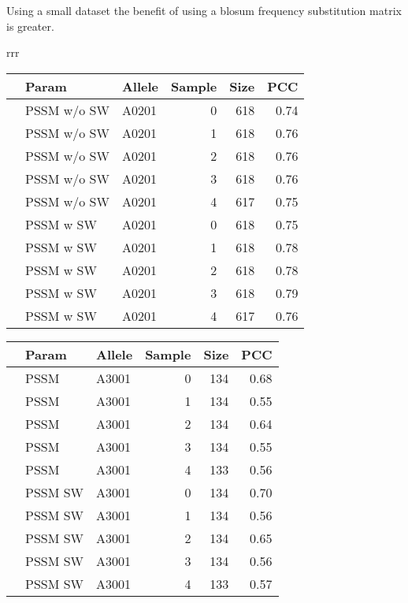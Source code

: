 Using a small dataset the benefit of using a blosum frequency substitution matrix is greater.
\begin{table*}\footnotesize

\begin{center}

\begin{tabular}{rrr}

\begin{tabular}{rllrrr}
  \hline
 & Param & Allele & Sample & Size & PCC \\ 
  \hline
 & PSSM w/o SW & A0201 &   0 & 618 & 0.74 \\ 
 & PSSM w/o SW & A0201 &   1 & 618 & 0.76 \\ 
 & PSSM w/o SW & A0201 &   2 & 618 & 0.76 \\ 
 & PSSM w/o SW & A0201 &   3 & 618 & 0.76 \\ 
 & PSSM w/o SW & A0201 &   4 & 617 & 0.75 \\ 
\hline
 & PSSM w SW & A0201 &   0 & 618 & 0.75 \\ 
 & PSSM w SW & A0201 &   1 & 618 & 0.78 \\ 
 & PSSM w SW & A0201 &   2 & 618 & 0.78 \\ 
 & PSSM w SW & A0201 &   3 & 618 & 0.79 \\ 
 & PSSM w SW & A0201 &   4 & 617 & 0.76 \\ 
   \hline
\end{tabular}

\begin{tabular}{rllrrr}
  \hline
 & Param & Allele & Sample & Size & PCC \\ 
  \hline
   & PSSM & A3001 &   0 & 134 & 0.68 \\ 
   & PSSM & A3001 &   1 & 134 & 0.55 \\ 
   & PSSM & A3001 &   2 & 134 & 0.64 \\ 
   & PSSM & A3001 &   3 & 134 & 0.55 \\ 
   & PSSM & A3001 &   4 & 133 & 0.56 \\ 
  \hline
   & PSSM SW & A3001 &   0 & 134 & 0.70 \\ 
   & PSSM SW & A3001 &   1 & 134 & 0.56 \\ 
   & PSSM SW & A3001 &   2 & 134 & 0.65 \\ 
   & PSSM SW & A3001 &   3 & 134 & 0.56 \\ 
   & PSSM SW & A3001 &   4 & 133 & 0.57 \\ 
   \hline
\end{tabular}


\end{tabular}
\end{center}
\end{table*}
